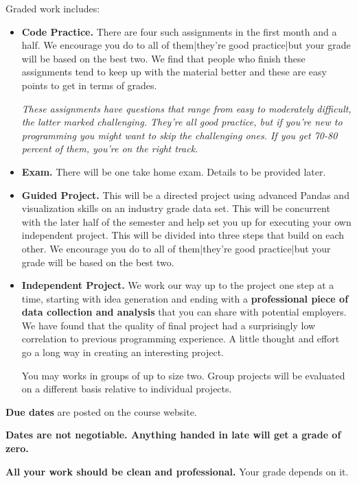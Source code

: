 Graded work includes:
\begin{itemize}

\item {\bf Code Practice.\/}
There are four such assignments in the first month and a half. We encourage you do to all of them|they're good practice|but your grade will be based on the best two. We find that people who finish these assignments tend to keep up with the material better and these are easy points to get in terms of grades.

{\it These assignments have questions that range from easy to moderately difficult,
the latter marked {\it challenging\/}.
They're all good practice, but if you're new to programming you
might want to skip the challenging ones.
If you get 70-80 percent of them, you're on the right track. \/}

\item {\bf Exam.\/}
There will be one take home exam. Details to be provided later.


\item {\bf Guided Project.\/}
This will be a directed project using advanced Pandas and visualization skills on an industry grade data set. This will be concurrent with the later half of the semester and help set you up for executing your own independent project. This will be divided into three steps that build on each other. We encourage you do to all of them|they're good practice|but your grade will be based on the best two.

\item {\bf Independent Project.\/}
We work our way up to the project one step at a time, starting with idea generation and ending
with a {\bf professional piece of data collection and analysis\/}
that you can share with potential employers. We have found that the quality
of final project had a surprisingly low correlation to previous programming experience. A little thought and
effort go a long way in creating an interesting project.

You may works in groups of up to size two. Group projects will be evaluated on a different basis relative to individual projects. 

\end{itemize}


{\bf Due dates} are posted on the course website.

{\bf Dates are not negotiable.
Anything handed in late will get a grade of zero.\/}

{\bf All your work should be clean and professional.}  Your grade depends on it.

